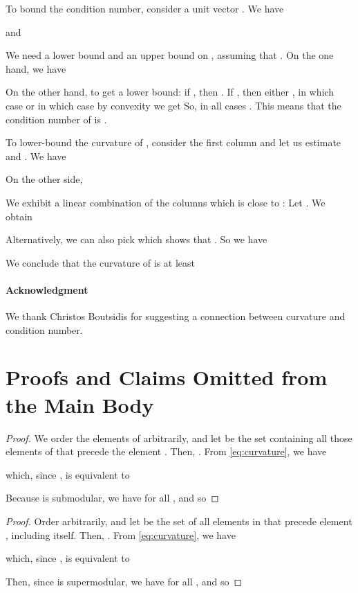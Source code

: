 \documentclass{article}
\theoremstyle{definition}
\begin{document}
To bound the condition number, consider a unit vector . We have

and

We need a lower bound and an upper bound on , assuming that . On the one hand, we have

On the other hand, to get a lower bound: if , then . If , then either , in which case  or  in which case by convexity we get  So, in all cases . This means that the condition number of  is .

To lower-bound the curvature of , consider the first column  and let us estimate  and . We have

On the other side,

We exhibit a linear combination of the columns  which is close to : Let . 
We obtain

Alternatively, we can also pick  which shows that . So we have

We conclude that the curvature of  is at least 

\paragraph{Acknowledgment}
We thank Christos Boutsidis for suggesting a connection between curvature and condition number.




\appendix



\section{Proofs and Claims Omitted from the Main Body}
\label{sec:omitt-proofs-claims}

\submodcurv*
\begin{proof}
We order the elements of  arbitrarily, and let  be the set containing all those elements of  that precede the element .  Then, .  From \eqref{eq:curvature}, we have

which, since , is equivalent to

Because  is submodular, we have  for all ,
and so

\end{proof}

\supmodcurv*
\begin{proof}
Order  arbitrarily, and let  be the set of all elements in  that precede element , including  itself.  Then, 
.
From \eqref{eq:curvature}, we have

which, since , is equivalent to

Then, since  is supermodular, we have  for all ,  and so

\end{proof}
\end{document}
